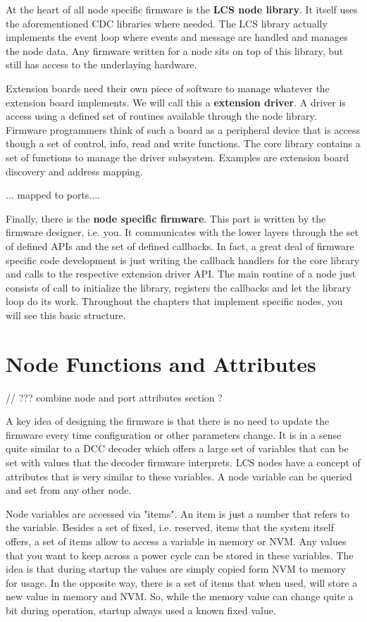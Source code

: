 At the heart of all node specific firmware is the \textbf{LCS node library}. It itself uses the aforementioned CDC libraries where needed. The LCS library actually implements the event loop where events and message are handled and manages the node data. Any firmware written for a node sits on top of this library, but still has access to the underlaying hardware. 

Extension boards need their own piece of software to manage whatever the extension board implements. We will call this a \textbf{extension driver}. A driver is access using a defined set of routines available through the node library. Firmware programmers think of such a board as a peripheral device that is access though a set of control, info, read and write functions. The core library contains a set of functions to manage the driver subsystem. Examples are extension board discovery and address mapping.

... mapped to ports....

Finally, there is the \textbf{node specific firmware}. This part is written by the firmware designer, i.e. you. It communicates with the lower layers through the set of defined APIs and the set of defined callbacks. In fact, a great deal of firmware specific code development is just writing the callback handlers for the core library and calls to the respective extension driver API.  The main routine of a node just consists of call to initialize the library, registers the callbacks and let the library loop do its work. Throughout the chapters that implement specific nodes, you will see this basic structure.

\section{Node Functions and Attributes}

// ??? combine node and port attributes section ?

A key idea of designing the firmware is that there is no need to update the firmware every time configuration or other parameters change. It is in a sense quite similar to a DCC decoder which offers a large set of variables that can be set with values that the decoder firmware interprets. LCS nodes have a concept of attributes that is very similar to these variables. A node variable can be queried and set from any other node.

Node variables are accessed via "items". An item is just a number that refers to the variable. Besides a set of fixed, i.e. reserved, items that the system itself offers, a set of items allow to access a variable in memory or NVM. Any values that you want to keep across a power cycle can be stored in these variables. The idea is that during startup the values are simply copied form NVM to memory for usage. In the opposite way, there is a set of items that when used, will store a new value in memory and NVM. So, while the memory value can change quite a bit during operation, startup always used a known fixed value.

